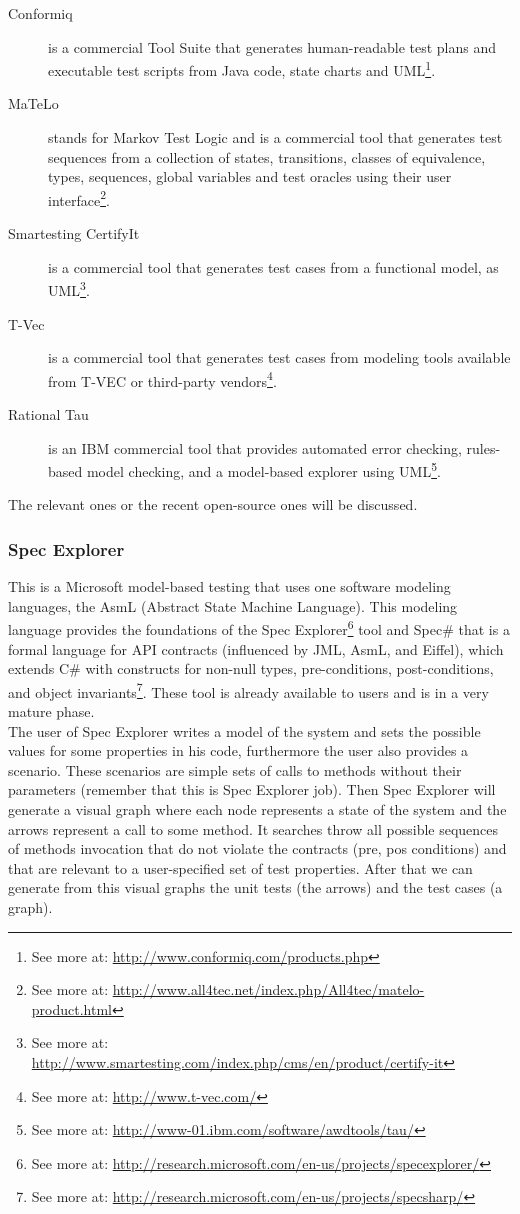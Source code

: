 \begin{description}
\item[Conformiq] is a commercial Tool Suite that generates
human-readable test plans and executable test scripts from Java code, state charts and UML\footnote{See more at: \url{http://www.conformiq.com/products.php}}.
\item[MaTeLo] stands for Markov Test Logic and is a commercial tool
that generates test sequences from a collection of states, transitions, classes of equivalence, types, sequences, global variables and test oracles
using their user interface\footnote{See more at: \url{http://www.all4tec.net/index.php/All4tec/matelo-product.html}}.
\item[Smartesting CertifyIt] is a commercial tool that generates test cases from a functional model, as UML\footnote{See more at: \url{http://www.smartesting.com/index.php/cms/en/product/certify-it}}.
\item[T-Vec] is a commercial tool that generates test cases from modeling tools available from T-VEC or third-party vendors\footnote{See more at: \url{http://www.t-vec.com/}}.
\item[Rational Tau] is an IBM commercial tool that provides automated error checking, rules-based model checking, and a model-based explorer using
UML\footnote{See more at: \url{http://www-01.ibm.com/software/awdtools/tau/}}.
\end{description}
The relevant ones or the recent open-source ones will be discussed.

\subsubsection{Spec Explorer}
This is a Microsoft model-based testing that uses one software modeling languages, the AsmL (Abstract State Machine Language).
This modeling language provides the foundations of the Spec Explorer\footnote{See more at: \url{http://research.microsoft.com/en-us/projects/specexplorer/}} tool
and Spec\# that is a formal language for API contracts (influenced by JML, AsmL, and Eiffel), which extends C\# with constructs for non-null types,
pre-conditions, post-conditions, and object invariants\footnote{See more at: \url{http://research.microsoft.com/en-us/projects/specsharp/}}.
These tool is already available to users and is in a very mature phase.\\
\indent The user of Spec Explorer writes a model of the system and sets the possible values for some properties in his code, furthermore the user also provides a scenario.
These scenarios are simple sets of calls to methods without their parameters (remember that this is Spec Explorer job).
Then Spec Explorer will generate a visual graph where each node represents a state of the system and the arrows represent a call to some method.
It searches throw all possible sequences of methods invocation that do not violate the contracts (pre, pos conditions) and
that are relevant to a user-specified set of test properties. After that we can generate from this visual graphs the unit tests (the arrows) and the
test cases (a graph).

